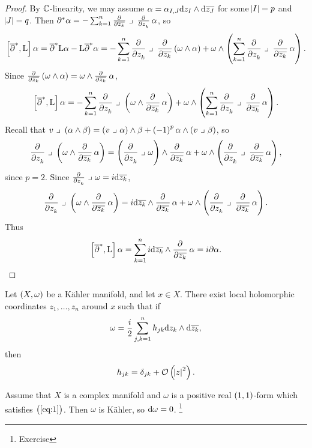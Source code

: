 \begin{proof}
By $ \mathbb{C} $-linearity, we may assume $ \alpha = \alpha_{I, J}\mathrm{d} z_I \wedge \mathrm{d}\overline{z_J} $ for some $ \abs{I} = p $ and $ \abs{J} = q $. Then $ \partial^*\alpha = -\sum_{k = 1}^n \tpd{}{\overline{z_k}} \ \lrcorner \ \tpd{}{z_k}\alpha $, so
$$ \sbr{\overline{\partial}^*, \L}\alpha = \overline{\partial}^*\L\alpha - \L\overline{\partial}^*\alpha = -\sum_{k = 1}^n \dpd{}{z_k} \ \lrcorner \ \dpd{}{\overline{z_k}}\br{\omega \wedge \alpha} + \omega \wedge \br{\sum_{k = 1}^n \dpd{}{z_k} \ \lrcorner \ \dpd{}{\overline{z_k}}\alpha}. $$
Since $ \tpd{}{\overline{z_k}}\br{\omega \wedge \alpha} = \omega \wedge \tpd{}{\overline{z_k}}\alpha $,
$$ \sbr{\overline{\partial}^*, \L}\alpha = -\sum_{k = 1}^n \dpd{}{z_k} \ \lrcorner \ \br{\omega \wedge \dpd{}{\overline{z_k}}\alpha} + \omega \wedge \br{\sum_{k = 1}^n \dpd{}{z_k} \ \lrcorner \ \dpd{}{\overline{z_k}}\alpha}. $$
Recall that $ v \ \lrcorner \ \br{\alpha \wedge \beta} = \br{v \ \lrcorner \ \alpha} \wedge \beta + \br{-1}^p\alpha \wedge \br{v \ \lrcorner \ \beta} $, so
$$ \dpd{}{z_k} \ \lrcorner \ \br{\omega \wedge \dpd{}{\overline{z_k}}\alpha} = \br{\dpd{}{z_k} \ \lrcorner \ \omega} \wedge \dpd{}{\overline{z_k}}\alpha + \omega \wedge \br{\dpd{}{z_k} \ \lrcorner \ \dpd{}{\overline{z_k}}\alpha}, $$
since $ p = 2 $. Since $ \tpd{}{z_k} \ \lrcorner \ \omega = i\d\overline{z_k} $,
$$ \dpd{}{z_k} \ \lrcorner \ \br{\omega \wedge \dpd{}{\overline{z_k}}\alpha} = i\d\overline{z_k} \wedge \dpd{}{\overline{z_k}}\alpha + \omega \wedge \br{\dpd{}{z_k} \ \lrcorner \ \dpd{}{\overline{z_k}}\alpha}. $$
Thus
$$ \sbr{\overline{\partial}^*, \L}\alpha = \sum_{k = 1}^n i\d\overline{z_k} \wedge \dpd{}{\overline{z_k}}\alpha = i\partial\alpha. $$
\end{proof}

\begin{theorem}
Let $ \br{X, \omega} $ be a K\"ahler manifold, and let $ x \in X $. There exist local holomorphic coordinates $ z_1, \dots, z_n $ around $ x $ such that if
$$ \omega = \dfrac{i}{2}\sum_{j, k = 1}^n h_{jk}\mathrm{d} z_k \wedge \mathrm{d}\overline{z_k}, $$
then
$$ h_{jk} = \delta_{jk} + \OOO\br{\abs{z}^2}. $$
\end{theorem}

\begin{remark*}
Assume that $ X $ is a complex manifold and $ \omega $ is a positive real $ \br{1, 1} $-form which satisfies $ \br{\ref{eq:1}} $. Then $ \omega $ is K\"ahler, so $ \mathrm{d}\omega = 0 $. \footnote{Exercise}
\end{remark*}

